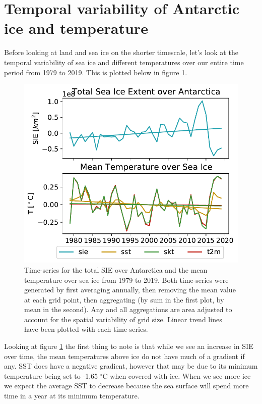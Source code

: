 \documentclass[../main.tex]{subfiles}
\begin{document}
\section{Temporal variability of Antarctic ice and temperature}
Before looking at land and sea ice on the shorter timescale, let's look at the temporal variability of sea ice and different temperatures over our entire time period from 1979 to 2019. This is plotted below in figure \ref{fig:timeseries_seaice_temperature_longterm}.
\begin{figure}[h!]
    \centering
    \includegraphics{images/week8/hres/seaice_temperature_timeseries}
    \caption{Time-series for the total SIE over Antarctica and the mean temperature over sea ice from 1979 to 2019. Both time-series were generated by first averaging annually, then removing the mean value at each grid point, then aggregating (by sum in the first plot, by mean in the second). Any and all aggregations are area adjusted to account for the spatial variability of grid size. Linear trend lines have been plotted with each time-series.}
    \label{fig:timeseries_seaice_temperature_longterm}
\end{figure}
Looking at figure \ref{fig:timeseries_seaice_temperature_longterm} the first thing to note is that while we see an increase in SIE over time, the mean temperatures above ice do not have much of a gradient if any. SST does have a negative gradient, however that may be due to its minimum temperature being set to -1.65 $^\circ$C when covered with ice. When we see more ice we expect the average SST to decrease because the sea surface will spend more time in a year at its minimum temperature.
\end{document}
